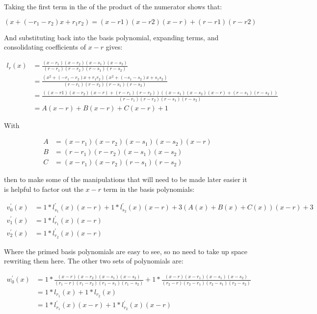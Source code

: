 \documentclass{article}
\begin{document}
\noindent Taking the first term in the of the product of the numerator shows that:

\[
    (x + (-r_{1} - r_{2}) x + r_{1} r_{2}) = (x - r1) (x - r2) (x - r) + (r - r1) (r - r2)  
\]

\noindent And substituting back into the basis polynomial, expanding terms, and consolidating coefficients of $ x - r $
gives:

\begin{align*}
    l_{r}(x) &= \frac{(x  - r_{1}) (x  - r_{2}) (x  - s_{1}) (x  - s_{2})}{(r  - r_{1}) (r  - r_{2}) (r  - s_{1}) (r  - s_{2})} \\
    &= \frac{(x^{2} + (-r_{1} - r_{2}) x + r_{1} r_{2}) (x^{2} + (-s_{1} - s_{2}) x + s_{1} s_{2})}{(r  - r_{1}) (r  - r_{2}) (r  - s_{1}) (r  - s_{2})} \\
    &= \frac{((x - r1) (x - r_{2}) (x - r) + (r - r_{1}) (r - r_{2}))((x - s_{1}) (x - s_{2}) (x - r) + (r - s_{1}) (r - s_{2}))}{(r  - r_{1}) (r  - r_{2}) (r  - s_{1}) (r  - s_{2})} \\
    &=  A (x - r) + B (x - r) + C (x - r) + 1
\end{align*}

\noindent With

\begin{align*}
    A &= (x - r_{1}) (x - r_{2}) (x - s_{1}) (x - s_{2}) (x - r) \\
    B &= (r - r_{1}) (r - r_{2}) (x - s_{1}) (x - s_{2}) \\
    C &= (x - r_{1}) (x - r_{2}) (r - s_{1}) (r - s_{2})
\end{align*}

\noindent then to make some of the manipulations that will need to be made later easier it is helpful to factor out the
$ x - r $ term in the basis polynomials:

\begin{align*}
    v^{'}_{0}(x) &= 1 * l^{'}_{s_{1}}(x) (x - r) + 1 * l^{'}_{s_{2}}(x) (x - r) + 3 (A(x) + B(x) + C(x)) (x - r) + 3 \\
    v^{'}_{1}(x) &= 1 * l^{'}_{r_{1}}(x) (x - r) \\
    v^{'}_{2}(x) &= 1 * l^{'}_{r_{2}}(x) (x - r)
\end{align*}

\noindent Where the primed basis polynomials are easy to see, so no need to take up space rewriting them here. The other two sets of polynomials are:

\begin{align*}
    w^{'}_{0}(x) &= 1 * \frac{(x  -  r) (x  - r_{2}) (x  - s_{1}) (x  - s_{2})}{(r_{1} -  r) (r_{1} - r_{2}) (r_{1} - s_{1}) (r_{1} - s_{2})} + 1 * \frac{(x  -  r) (x  - r_{1}) (x  - s_{1}) (x  - s_{2})}{(r_{2} -  r) (r_{2} - r_{1}) (r_{2} - s_{1}) (r_{2} - s_{2})} \\
    &= 1 * l_{r_{1}}(x) + 1 * l_{r_{2}}(x) \\
    &= 1 * l^{'}_{r_{1}}(x) (x - r) + 1 * l^{'}_{r_{2}}(x) (x - r)
\end{align*}
\end{document}
